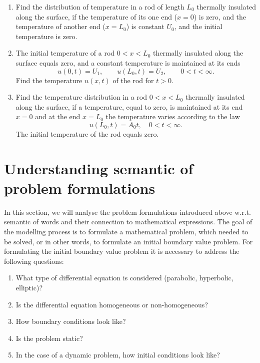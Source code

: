 \begin{enumerate}
\item Find the distribution of temperature in a rod of length $L_{0}$ thermally insulated along the surface, if the temperature of its one end ($x=0$) is zero, and the temperature of another end ($x=L_{0}$) is constant $U_{0}$, and the initial temperature is zero.
\item The initial temperature of a rod $0< x< L_{0}$ thermally insulated along the surface equals zero, and a constant temperature is maintained at its ends 
\begin{equation*}
u(0,t)=U_{1}, \qquad u(L_{0},t)=U_{2}, \qquad 0<t<\infty.
\end{equation*}
Find the temperature $u(x,t)$ of the rod for $t>0$.
\item Find the temperature distribution in a rod $0<x<L_{0}$ thermally insulated along the surface, if a temperature, equal to zero, is maintained at its end $x=0$ and at the end $x=L_{0}$ the temperature varies according to the law
\begin{equation*}
u(L_{0},t)=A_{0}t, \quad 0<t<\infty.
\end{equation*}
The initial temperature of the rod equals zero.
\end{enumerate}\par

\section{Understanding semantic of problem formulations}

In this section, we will analyse the problem formulations introduced above w.r.t. semantic of words and their connection to mathematical expressions. The goal of the modelling process is to formulate a mathematical problem, which needed to be solved, or in other words, to formulate an initial boundary value problem. For formulating the initial boundary value problem it is necessary to address the following questions:
\begin{enumerate}
\item What type of differential equation is considered (parabolic, hyperbolic, elliptic)?
\item Is the differential equation homogeneous or non-homogeneous?
\item How boundary conditions look like?
\item Is the problem static?
\item In the case of a dynamic problem, how initial conditions look like?
\end{enumerate}

